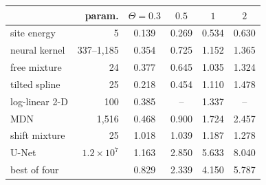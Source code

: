 \begin{tabular}{@{}lrcccc@{}}
\toprule
 & param. & $\Theta=0.3$ & $0.5$ & $1$ & $2$\\
\midrule
site energy & 5 & 0.139 & 0.269 & 0.534 & 0.630\\
neural kernel & 337--1{,}185 & 0.354 & 0.725 & 1.152 & 1.365\\
free mixture & 24 & 0.377 & 0.645 & 1.035 & 1.324\\
tilted spline & 25 & 0.218 & 0.454 & 1.110 & 1.478\\
log-linear 2-D & 100 & 0.385 & -- & 1.337 & --\\
MDN & 1{,}516 & 0.468 & 0.900 & 1.724 & 2.457\\
shift mixture & 25 & 1.018 & 1.039 & 1.187 & 1.278\\
\midrule
U-Net & $1.2\times10^{7}$ & 1.163 & 2.850 & 5.633 & 8.040\\
best of four &  & 0.829 & 2.339 & 4.150 & 5.787\\
\bottomrule
\end{tabular}
